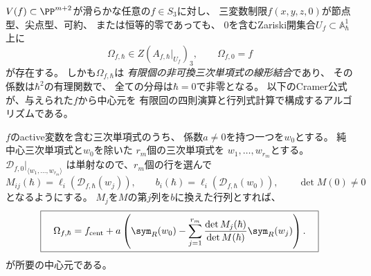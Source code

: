 \begin{theorem}[全滑らかな三次ブロックに対する普遍Cramer中心元]
\label{thm:pg-universal-determinant}
$V(f)\subset\PP^{m+2}$が滑らかな任意の$f\in S_3$に対し、
三変数制限$f(x,y,z,0)$が節点型、尖点型、可約、
または恒等的零であっても、
$0$を含むZariski開集合$U_f\subset\mathbb A^1_\hbar$上に
\begin{equation}
 \boxed{\quad
 \Omega_{f,\hbar}\in
 Z\!\left(A_{f,\hbar}|_{U_f}\right)_3,\qquad
 \Omega_{f,0}=f
 \quad}
 \label{eq:pg-det-all-centers}
\end{equation}
が存在する。
しかも$\Omega_{f,\hbar}$は
\emph{有限個の非可換三次単項式の線形結合}であり、
その係数は$\hbar^2$の有理関数で、
全ての分母は$\hbar=0$で非零となる。
以下のCramer公式が、与えられた$f$から中心元を
有限回の四則演算と行列式計算で構成するアルゴリズムである。

$f$のactive変数を含む三次単項式のうち、
係数$a\ne0$を持つ一つを$w_0$とする。
純中心三次単項式と$w_0$を除いた
$r_m$個の三次単項式を
$w_1,\ldots,w_{r_m}$とする。
$\mathcal D_{f,0}|_{\langle w_1,\ldots,w_{r_m}\rangle}$
は単射なので、$r_m$個の行を選んで
\begin{equation}
 M_{ij}(\hbar)=\ell_i(\mathcal D_{f,\hbar}(w_j)),
 \qquad
 b_i(\hbar)=\ell_i(\mathcal D_{f,\hbar}(w_0)),
 \qquad
 \det M(0)\ne0
 \label{eq:pg-det-minor}
\end{equation}
となるようにする。
$M_j$を$M$の第$j$列を$b$に換えた行列とすれば、
\begin{equation}
 \boxed{\quad
 \Omega_{f,\hbar}
 =f_{\mathrm{cent}}+
 a\left(
 \sym_R(w_0)-\sum_{j=1}^{r_m}
 \frac{\det M_j(\hbar)}{\det M(\hbar)}\sym_R(w_j)
 \right).
 \quad}
 \label{eq:pg-det-universal-center}
\end{equation}
が所要の中心元である。
\end{theorem}
